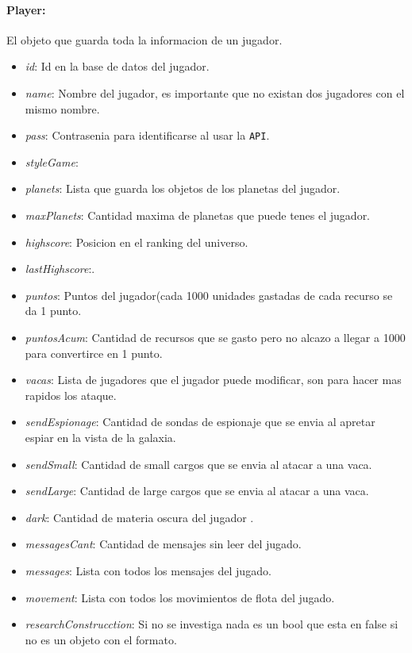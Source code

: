 \documentclass{article}
\begin{document}
\paragraph{Player:} El objeto que guarda toda la informacion de un jugador.
\vspace{-5mm}
\begin{itemize}[noitemsep]
    \item \textit{id}: Id en la base de datos del jugador.
    \item \textit{name}: Nombre del jugador, es importante que no existan dos jugadores con el mismo nombre.
    \item \textit{pass}: Contrasenia para identificarse al usar la \texttt{API}.
    \item \textit{styleGame}: %
    \item \textit{planets}: Lista que guarda los objetos de los planetas del jugador.
    \item \textit{maxPlanets}: Cantidad maxima de planetas que puede tenes el jugador.
    \item \textit{highscore}: Posicion en el ranking del universo.
    \item \textit{lastHighscore}:.
    \item \textit{puntos}: Puntos del jugador(cada 1000 unidades gastadas de cada recurso se da 1 punto.
    \item \textit{puntosAcum}: Cantidad de recursos que se gasto pero no alcazo a llegar a 1000 para convertirce en 1 punto.
    \item \textit{vacas}: Lista de jugadores que el jugador puede modificar, son para hacer mas rapidos los ataque.
    \item \textit{sendEspionage}: Cantidad de sondas de espionaje que se envia al apretar espiar en la vista de la galaxia.
    \item \textit{sendSmall}: Cantidad de small cargos que se envia al atacar a una vaca.
    \item \textit{sendLarge}: Cantidad de large cargos que se envia al atacar a una vaca.
    \item \textit{dark}: Cantidad de materia oscura del jugador .
    \item \textit{messagesCant}: Cantidad de mensajes sin leer del jugado.
    \item \textit{messages}: Lista con todos los mensajes del jugado.
    \item \textit{movement}: Lista con todos los movimientos de flota del jugado.
    \item \textit{researchConstrucction}: Si no se investiga nada es un bool que esta en false si no es un objeto con el formato.

\end{itemize}
\end{document}
